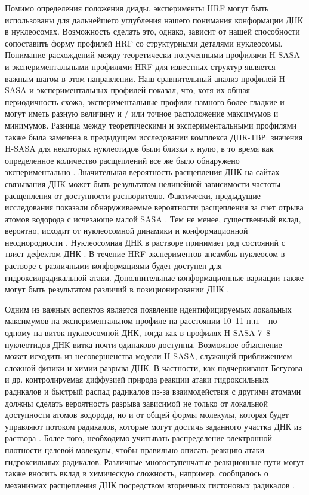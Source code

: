 Помимо определения положения диады, эксперименты HRF могут быть использованы для дальнейшего углубления нашего понимания конформации ДНК в нуклеосомах. Возможность сделать это, однако, зависит от нашей способности сопоставить форму профилей HRF со структурными деталями нуклеосомы. Понимание расхождений между теоретически полученными профилями H-SASA и экспериментальными профилями HRF для известных структур является важным шагом в этом направлении. Наш сравнительный анализ профилей H-SASA и экспериментальных профилей показал, что, хотя их общая периодичность схожа, экспериментальные профили намного более гладкие и могут иметь разную величину и / или точное расположение максимумов и минимумов. Разница между теоретическими и экспериментальными профилями также была замечена в предыдущем исследовании комплекса ДНК-ТВР: значения H-SASA для некоторых нуклеотидов были близки к нулю, в то время как определенное количество расщеплений все же было обнаружено экспериментально \cite{pastor_detailed_2000}. Значительная вероятность расщепления ДНК на сайтах связывания ДНК может быть результатом нелинейной зависимости частоты расщепления от доступности растворителю. Фактически, предыдущие исследования показали обнаруживаемые вероятности расщепления за счет отрыва атомов водорода с исчезающе малой SASA \cite{balasubramanian_dna_1998}. Тем не менее, существенный вклад, вероятно, исходит от нуклеосомной динамики и конформационной неоднородности \cite{rychkov_partially_2017,winogradoff_shearing_2015}. Нуклеосомная ДНК в растворе принимает ряд состояний с твист-дефектом ДНК \cite{edayathumangalam_nucleosomes_2005}. В течение HRF экспериментов ансамбль нуклеосом в растворе с различными конформациями будет доступен для гидроксилрадикальной атаки. Дополнительные конформационные вариации также могут быть результатом различий в позиционировании ДНК \cite{widom_role_2001}.

Одним из важных аспектов является появление идентифицируемых локальных максимумов на экспериментальном профиле на расстоянии 10–11 п.н. - по одному на виток нуклеосомной ДНК, тогда как в профилях H-SASA 7–8 нуклеотидов ДНК витка почти одинаково доступны. Возможное объяснение может исходить из несовершенства модели H-SASA, служащей приближением сложной физики и химии разрыва ДНК. В частности, как подчеркивают Бегусова и др. контролируемая диффузией природа реакции атаки гидроксильных радикалов и быстрый распад радикалов из-за взаимодействия с другими атомами должны сделать вероятность разрыва зависимой не только от локальной доступности атомов водорода, но и от общей формы молекулы, которая будет управляют потоком радикалов, которые могут достичь заданного участка ДНК из раствора \cite{begusova_radack_2001,begusova_radiolysis_2000}. Более того, необходимо учитывать распределение электронной плотности целевой молекулы, чтобы правильно описать реакцию атаки гидроксильных радикалов. Различные многоступенчатые реакционные пути могут также вносить вклад в химическую сложность, например, сообщалось о механизмах расщепления ДНК посредством вторичных гистоновых радикалов \cite{zhou_dna_2014}.

